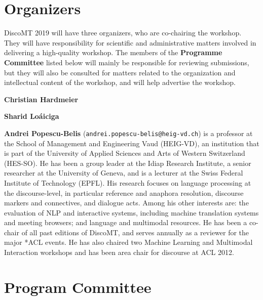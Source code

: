 \documentclass[11pt]{article}
\begin{document}
\section{Organizers}

DiscoMT 2019 will have three organizers, who are co-chairing the workshop.  They will have responsibility for scientific and administrative matters involved in delivering a high-quality workshop.  The members of the \textbf{Programme Committee} listed below will mainly be responsible for reviewing submissions, but they will also be consulted for matters related to the organization and intellectual content of the workshop, and will help advertise the workshop.


\textbf{Christian Hardmeier}


\textbf{Sharid Loáiciga}

\textbf{Andrei Popescu-Belis} (\texttt{andrei.popescu-belis@heig-vd.ch}) is a professor at the School of Management and Engineering Vaud (HEIG-VD), an institution that is part of the University of Applied Sciences and Arts of Western Switzerland (HES-SO).  He has been a group leader at the Idiap Research Institute, a senior researcher at the University of Geneva, and is a lecturer at the Swiss Federal Institute of Technology (EPFL).  His research focuses on language processing at the discourse-level, in particular reference and anaphora resolution, discourse markers and connectives, and dialogue acts.  Among his other interests are: the evaluation of NLP and interactive systems, including machine translation systems and meeting browsers; and language and multimodal resources.  He has been a co-chair of all past editions of DiscoMT, and serves annually as a reviewer for the major *ACL events.  He has also chaired two Machine Learning and Multimodal Interaction workshops and has been area chair for discourse at ACL 2012.


\section{Program Committee}

\end{document}
